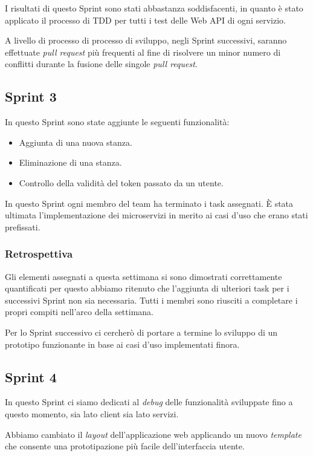 I risultati di questo Sprint sono stati abbastanza soddisfacenti, in quanto è stato applicato il processo di TDD per tutti i test delle Web API di ogni servizio.

A livello di processo di processo di sviluppo, negli Sprint successivi, saranno effettuate \textit{pull request} più frequenti al fine di risolvere un minor numero di conflitti durante la fusione delle singole \textit{pull request}.

\subsection{Sprint 3}

In questo Sprint sono state aggiunte le seguenti funzionalità:

\begin{itemize}
%
    \item Aggiunta di una nuova stanza.
%
    \item Eliminazione di una stanza.
%
    \item Controllo della validità del token passato da un utente.
%
\end{itemize}

In questo Sprint ogni membro del team ha terminato i task assegnati. È stata ultimata l'implementazione dei microservizi in merito ai casi d'uso che erano stati prefissati.

\subsubsection{Retrospettiva}

Gli elementi assegnati a questa settimana si sono dimostrati correttamente quantificati per questo abbiamo ritenuto che l'aggiunta di ulteriori task per i successivi Sprint non sia necessaria.
Tutti i membri sono riusciti a completare i propri compiti nell'arco della settimana.

Per lo Sprint successivo ci cercherò di portare a termine lo sviluppo di un prototipo funzionante in base ai casi d'uso implementati finora.

\subsection{Sprint 4}

In questo Sprint ci siamo dedicati al \textit{debug} delle funzionalità sviluppate fino a questo momento, sia lato client sia lato servizi.

Abbiamo cambiato il \textit{layout} dell'applicazione web applicando un nuovo \textit{template} che consente una prototipazione più facile dell'interfaccia utente.


